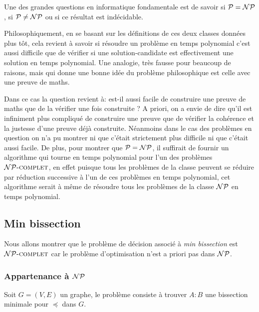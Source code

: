 \documentclass{standalone}
\begin{document}
Une des grandes questions en informatique fondamentale est de savoir si $\mathcal{P} = \mathcal{NP}$, si $\mathcal{P} \not= \mathcal{NP}$ ou si ce résultat est indécidable.

Philosophiquement, en se basant sur les définitions de ces deux classes données plus tôt, cela revient à savoir si résoudre un problème en temps polynomial c'est aussi difficile que de vérifier si une solution-candidate est effectivement une solution en temps polynomial. Une analogie, très fausse pour beaucoup de raisons, mais qui donne une bonne idée du problème philosophique est celle avec une preuve de maths.

Dans ce cas la question revient à: est-il aussi facile de construire une preuve de maths que de la vérifier une fois construite ? A priori, on a envie de dire qu'il est infiniment plus compliqué de construire une preuve que de vérifier la cohérence et la justesse d'une preuve déjà construite. Néanmoins dans le cas des problèmes en question on n'a pu montrer ni que c'était strictement plus difficile ni que c'était aussi facile. De plus, pour montrer que $\mathcal{P} = \mathcal{NP}$, il suffirait de fournir un algorithme qui tourne en temps polynomial pour l'un des problèmes $\mathcal{NP}\text{\textsc{-complet}}$, en effet puisque tous les problèmes de la classe peuvent se réduire par réduction successive à l'un de ces problèmes en temps polynomial, cet algorithme serait à même de résoudre tous les problèmes de la classe $\mathcal{NP}$ en temps polynomial.
 
\subsection{Min bissection}

Nous allons montrer que le problème de décision associé à \textit{min bissection} est $\mathcal{NP}\text{\textsc{-complet}}$ car le problème d'optimisation n'est a priori pas dans $\mathcal{NP}$.

\subsubsection{Appartenance à $\mathcal{NP}$}

\begin{defn}
	Soit $G=(V, E)$ un graphe, le problème consiste à trouver $A:B$ une bissection minimale pour $\preceq$ dans $G$.
\end{defn}
\end{document}

